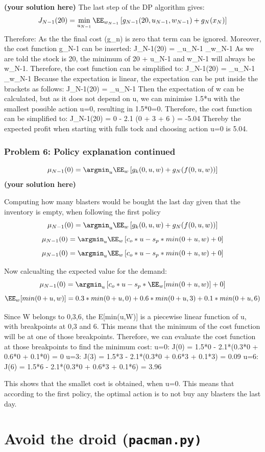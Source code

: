 \documentclass[12pt,twoside]{article}
\newcommand\redt[1]{ {\textcolor[rgb]{0.60, 0.00, 0.00}{\textbf{ #1} } } }
\newcommand{\yoursolution}{ \redt{(your solution here) } }
\begin{document}
	\yoursolution The last step of the DP algorithm gives:
	$$
	J_{N-1}(20)  = \min_{u_{N-1} } \EE_{w_{N-1} }\left[ g_{N-1}(20, u_{N-1}, w_{N-1} ) +  g_N(x_N) \right]
	$$
	Therefore:
	As the the final cost (g_n) is zero that term can be ignored. Moreover, the cost function g_{N-1} can be inserted:
	J_{N-1}(20) = \min_{u_{N-1} } \EE_{w_{N-1} }
	As we are told the stock is 20, the minimum of 20 + u_{N-1} and w_{N-1} will always be w_{N-1}. 
	Therefore, the cost function can be simplified to:
	J_{N-1}(20) = \min_{u_{N-1} } \EE_{w_{N-1} }
	Because the expectation is linear, the expectation can be put inside the brackets as follows:
	J_{N-1}(20) = \min_{u_{N-1} } 
	Then the expectation of w can be calculated, but as it does not depend on u, we can minimise 1.5*u with the smallest possible action u=0, resulting in 1.5*0=0.
	Therefore, the cost function can be simplified to:
	J_{N-1}(20) = 0 - 2.1 \cdot (0  + 3  + 6 ) = -5.04
	Thereby the expected profit when starting with fulls tock and choosing action u=0 is 5.04.
	
\subsubsection*{{\color{red}Problem 6:  Policy explanation continued}}
	
	$$\mu_{N-1}(0) = \argmin_u \EE_{w} \left[g_k(0, u, w) + g_N( f(0,u,w) ) \right] $$
\yoursolution

Computing how many blasters would be bought the last day given that the inventory is empty, 
when following the first policy
$$\mu_{N-1}(0) = \argmin_u \EE_{w} \left[g_k(0, u, w) + g_N( f(0,u,w) ) \right] $$
$$\mu_{N-1}(0) = \argmin_u \EE_{w} \left[c_o*u - s_p*min(0+u,w) + 0 \right]  $$
$$\mu_{N-1}(0) = \argmin_u \EE_{w} \left[c_o*u - s_p*min(0+u,w) + 0 \right] $$

Now calcualting the expected value for the demand:
$$\mu_{N-1}(0) = \argmin_u \left[c_o*u - s_p*\EE_{w}[min(0+u,w)] + 0 \right] $$
$$ \EE_{w}[min(0+u,w)] = 0.3*min(0+u,0) + 0.6*min(0+u,3) + 0.1*min(0+u,6) $$

Since W belongs to {0,3,6}, the E[min(u,W)] is a piecewise linear function of u, with breakpoints at 0,3 and 6.
This means that the minimum of the cost function will be at one of those breakpoints.
Therefore, we can evaluate the cost function at those breakpoints to find the minimum cost:
u=0: J(0) = 1.5*0 - 2.1*(0.3*0 + 0.6*0 + 0.1*0) = 0
u=3: J(3) = 1.5*3 - 2.1*(0.3*0 + 0.6*3 + 0.1*3) = 0.09
u=6: J(6) = 1.5*6 - 2.1*(0.3*0 + 0.6*3 + 0.1*6) = 3.96

This shows that the smallet cost is obtained, when u=0.
This means that according to the first policy, the optimal action is to not buy any blasters the last day.

\section{Avoid the droid (\texttt{pacman.py)}} 
\end{document}
